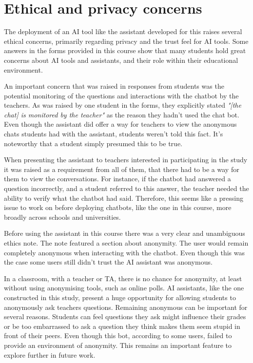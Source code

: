 \section{Ethical and privacy concerns}


The deployment of an AI tool like the assistant developed for this raises several ethical concerns, primarily regarding privacy and the trust feel for AI tools. Some answers in the forms provided in this course show that many students hold great concerns about AI tools and assistants, and their role within their educational environment.


An important concern that was raised in responses from students was the potential monitoring of the questions and interactions with the chatbot by the teachers. As was raised by one student in the forms, they explicitly stated \textit{"[the chat] is monitored by the teacher"} as the reason they hadn’t used the chat bot. Even though the assistant did offer a way for teachers to view the anonymous chats students had with the assistant, students weren’t told this fact. It’s noteworthy that a student simply presumed this to be true.


When presenting the assistant to teachers interested in participating in the study it was raised as a requirement from all of them, that there had to be a way for them to view the conversations. For instance, if the chatbot had answered a question incorrectly, and a student referred to this answer, the teacher needed the ability to verify what the chatbot had said. Therefore, this seems like a pressing issue to work on before deploying chatbots, like the one in this course, more broadly across schools and universities.


Before using the assistant in this course there was a very clear and unambiguous ethics note. The note featured a section about anonymity. The user would remain completely anonymous when interacting with the chatbot. Even though this was the case some users still didn’t trust the AI assistant was anonymous.


In a classroom, with a teacher or TA, there is no chance for anonymity, at least without using anonymising tools, such as online polls. AI assistants, like the one constructed in this study, present a huge opportunity for allowing students to anonymously ask teachers questions. Remaining anonymous can be important for several reasons. Students can feel questions they ask might influence their grades or be too embarrassed to ask a question they think makes them seem stupid in front of their peers. Even though this bot, according to some users, failed to provide an environment of anonymity. This remains an important feature to explore further in future work.


